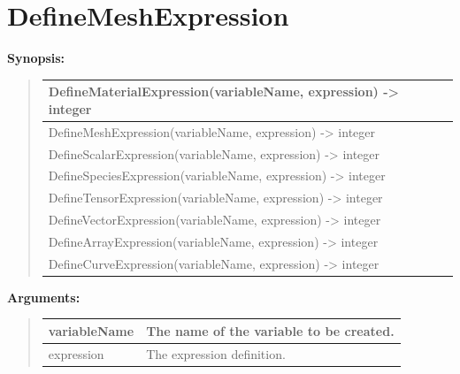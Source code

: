 \documentclass[letterpaper,10pt,english]{sphinxmanual}
\begin{document}
\section{DefineMeshExpression}
\label{functions:definemeshexpression}
\begin{DUlineblock}{0em}
\item[] \textbf{Synopsis:}
\end{DUlineblock}
\begin{quote}

\begin{tabulary}{\linewidth}{|L|}
\hline

DefineMaterialExpression(variableName, expression) -\textgreater{} integer
\\
\hline
DefineMeshExpression(variableName, expression) -\textgreater{} integer
\\
\hline
DefineScalarExpression(variableName, expression) -\textgreater{} integer
\\
\hline
DefineSpeciesExpression(variableName, expression) -\textgreater{} integer
\\
\hline
DefineTensorExpression(variableName, expression) -\textgreater{} integer
\\
\hline
DefineVectorExpression(variableName, expression) -\textgreater{} integer
\\
\hline
DefineArrayExpression(variableName, expression) -\textgreater{} integer
\\
\hline
DefineCurveExpression(variableName, expression) -\textgreater{} integer
\\
\hline\end{tabulary}

\end{quote}

\begin{DUlineblock}{0em}
\item[] 
\item[] \textbf{Arguments:}
\end{DUlineblock}
\begin{quote}

\begin{tabulary}{\linewidth}{|L|L|}
\hline

variableName
 & 
The name of the variable to be created.
\\
\hline
expression
 & 
The expression definition.
\\
\hline\end{tabulary}

\end{quote}
\end{document}

